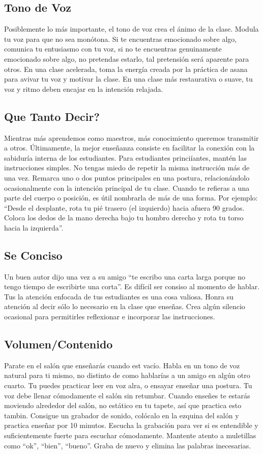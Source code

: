 \subsection{Tono de Voz}
Posiblemente lo más importante, el tono de voz crea el ánimo de la clase. Modula tu voz para que no sea monótona. Si te encuentras emocionado sobre algo, comunica tu entusiasmo con tu voz, si no te encuentras genuinamente emocionado sobre algo, no pretendas estarlo, tal pretensión será aparente para otros. En una clase acelerada, toma la energía creada por la práctica de asana para avivar tu voz y motivar la clase. En una clase más restaurativa o suave, tu voz y ritmo deben encajar en la intención relajada.

\subsection{Que Tanto Decir?}
Mientras más aprendemos como maestros, más conocimiento queremos transmitir a otros. Últimamente, la mejor enseñanza consiste en facilitar la conexión con la sabiduría interna de los estudiantes. Para estudiantes princiíantes, mant\'en las instrucciones simples. No tengas miedo de repetir la misma instrucción más de una vez. Remarca uno o dos puntos principales en una postura, relacionándolo ocasionalmente con la intención principal de tu clase. Cuando te refieras a una parte del cuerpo o posición, es útil nombrarla de más de una forma. Por ejemplo: ``Desde el desplante, rota tu pi\'e trasero (el izquierdo) hacia afuera 90 grados. Coloca los dedos de la mano derecha bajo tu hombro derecho y rota tu torso hacia la izquierda''.

\subsection{Se Conciso}
Un buen autor dijo una vez a su amigo ``te escribo una carta larga porque no tengo tiempo de escribirte una corta''. Es difícil ser consiso al momento de hablar. Tus la atención enfocada de tus estudiantes es una cosa valiosa. Honra su atención al decir sólo lo necesario en la clase que enseñas. Crea algún silencio ocasional para permitirles reflexionar e incorporar las instrucciones.

\subsection{Volumen/Contenido}
Parate en el salón que enseñarás cuando est vacío. Habla en un tono de voz natural para ti mismo, no distinto de como hablarías a un amigo en algún otro cuarto. Tu puedes practicar leer en voz alra, o ensayar enseñar una postura. Tu voz debe llenar cómodamente el salón sin retumbar. Cuando enseñes te estarás moviendo alrededor del salón, no estático en tu tapete, así que practica esto tambin. Consigue un grabador de sonido, colócalo en la ezquina del salón y practica enseñar por 10 minutos. Escucha la grabación para ver si es entendible y suficientemente fuerte para escuchar cómodamente. Mantente atento a muletillas como ``ok'', ``bien'', ``bueno''. Graba de nuevo y elimina las palabras inecesarias.

